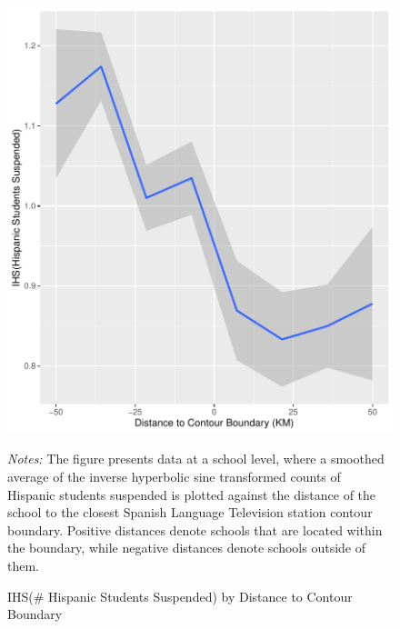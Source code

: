 \documentclass[11pt]{article}
\begin{document}
\begin{figure}[!hbtp]
\centering
\caption{IHS(\# Hispanic Students Suspended) by Distance to Contour Boundary }\label{suspensionsfig}
\includegraphics[width=12cm]{../../analysis/Output/graphs/hispanicsuspensions.pdf}

\textit{Notes:} The figure presents data at a school level, where a smoothed average of the inverse hyperbolic sine transformed counts of Hispanic students suspended is plotted against the distance of the school to the closest Spanish Language Television station contour boundary. Positive distances denote schools that are located within the boundary, while negative distances denote schools outside of them.
\end{figure} 
\end{document}
